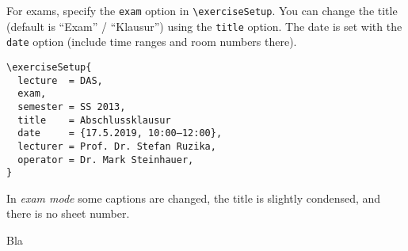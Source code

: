 \documentclass[german]{mhexsheet}
\begin{document}
\maketitle
For exams, specify the \verb|exam| option in \verb|\exerciseSetup|. You can change the title (default is \enquote{Exam} / \enquote{Klausur}) using the \verb|title| option. The date is set with the \verb|date| option (include time ranges and room numbers there).

\begin{verbatim}
\exerciseSetup{
  lecture  = DAS,    
  exam,              
  semester = SS 2013,
  title    = Abschlussklausur
  date     = {17.5.2019, 10:00–12:00},
  lecturer = Prof. Dr. Stefan Ruzika,
  operator = Dr. Mark Steinhauer,
}
\end{verbatim}
In \emph{exam mode} some captions are changed, the title is slightly condensed, and there is no sheet number.
\begin{exercise}[points=10]
Bla
\end{exercise}

\begin{solution}[points=3+3+4]


\end{solution}

\begin{exercise}
\end{exercise}
\end{document}
